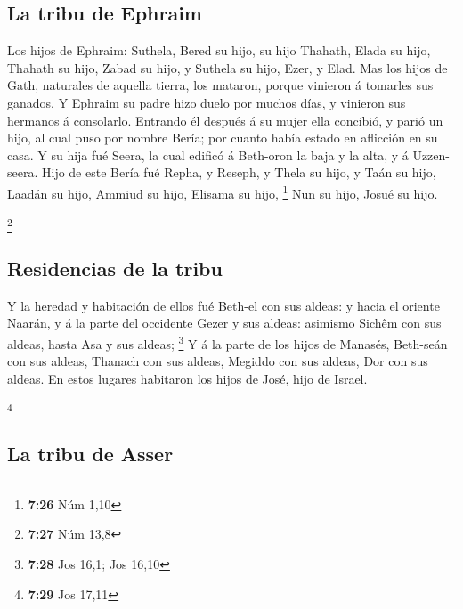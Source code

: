 \hypertarget{la-tribu-de-ephraim}{%
\subsection{La tribu de Ephraim}\label{la-tribu-de-ephraim}}

 Los hijos de Ephraim: Suthela, Bered su hijo, su hijo
Thahath, Elada su hijo, Thahath su hijo,  Zabad su hijo,
y Suthela su hijo, Ezer, y Elad. Mas los hijos de Gath, naturales de
aquella tierra, los mataron, porque vinieron á tomarles sus ganados.
 Y Ephraim su padre hizo duelo por muchos días, y
vinieron sus hermanos á consolarlo.  Entrando él después
á su mujer ella concibió, y parió un hijo, al cual puso por nombre
Bería; por cuanto había estado en aflicción en su casa. 
Y su hija fué Seera, la cual edificó á Beth-oron la baja y la alta, y á
Uzzen-seera.  Hijo de este Bería fué Repha, y Reseph, y
Thela su hijo, y Taán su hijo,  Laadán su hijo, Ammiud su
hijo, Elisama su hijo, \footnote{\textbf{7:26} Núm 1,10} 
Nun su hijo, Josué su hijo.

\footnote{\textbf{7:27} Núm 13,8}

\hypertarget{residencias-de-la-tribu}{%
\subsection{Residencias de la tribu}\label{residencias-de-la-tribu}}

 Y la heredad y habitación de ellos fué Beth-el con sus
aldeas: y hacia el oriente Naarán, y á la parte del occidente Gezer y
sus aldeas: asimismo Sichêm con sus aldeas, hasta Asa y sus aldeas;
\footnote{\textbf{7:28} Jos 16,1; Jos 16,10}  Y á la
parte de los hijos de Manasés, Beth-seán con sus aldeas, Thanach con sus
aldeas, Megiddo con sus aldeas, Dor con sus aldeas. En estos lugares
habitaron los hijos de José, hijo de Israel.

\footnote{\textbf{7:29} Jos 17,11}

\hypertarget{la-tribu-de-asser}{%
\subsection{La tribu de Asser}\label{la-tribu-de-asser}}

